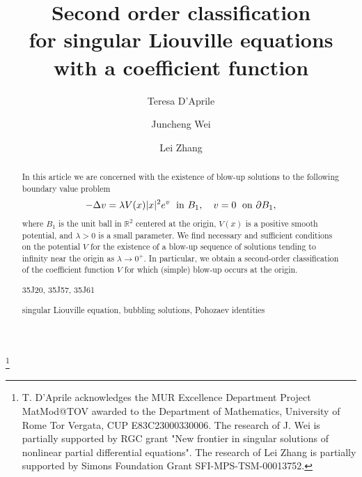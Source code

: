 \documentclass[reqno,11pt]{amsart}
\theoremstyle{definition}
\numberwithin{equation}{section}
\newcommand{\R}{\mathbb{R}}
\newcommand{\la}{\lambda}
\renewcommand{\(}{\left(}
\renewcommand{\)}{\right)}
\renewcommand{\[}{\left[}
\renewcommand{\]}{\right]}
\begin{document}
\title[Second order theorem]{{\Large{Second order  classification \\ for singular Liouville equations \\ \vspace{1mm} with a coefficient function}}}
\author[Teresa D'Aprile]{ Teresa D'Aprile}
\author[Juncheng Wei]{Juncheng Wei}
\author[Lei Zhang]{Lei Zhang} 
\address[Teresa D'Aprile] {Dipartimento di Matematica, Universit\`a di Roma ``Tor
Vergata", via della Ricerca Scientifica 1, 00133 Roma, Italy.}
\address[Juncheng Wei]{Department of Mathematics \\ Chinese University of Hong Kong \\ Shatin, NT, Hong Kong}

\address[Lei Zhang]{Department of Mathematics\\
        University of Florida\\
        1400 Stadium Rd\\
        Gainesville FL 32611}





\thanks{ T. D’Aprile acknowledges the MUR Excellence
Department Project MatMod@TOV awarded to the Department of Mathematics, University of Rome
Tor Vergata, CUP E83C23000330006.  The research of J. Wei is partially supported by RGC grant "New frontier in singular solutions of nonlinear partial differential equations". The research of  Lei Zhang is partially supported by Simons Foundation Grant SFI-MPS-TSM-00013752.}
\begin{abstract}
In this article we 
are concerned with the existence of blow-up solutions
 to the following boundary value problem $$-\Delta v= \la V(x) |x|^2e^v\;\hbox{ in } B_1,\quad	v=0 \;\hbox{ on }\partial B_1,$$  where $B_1$ is the unit ball in $\R^2$ centered at the origin, $V(x)$ is a positive  smooth  potential, and $\la>0$ is a small parameter. 
We find necessary and sufficient conditions on the potential $V$  for the existence 
of  a blow-up sequence of solutions  tending to
infinity near the origin as $\la\to 0^+$. 
In particular, we obtain a second-order classification of the coefficient function 
$V$ for which (simple) blow-up occurs at the origin.
\bigskip

 35J20, 35J57,
35J61

  singular Liouville equation,  bubbling solutions,
Pohozaev identities
\end{abstract}
\end{document}
